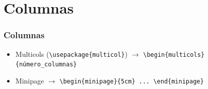 \section{Columnas}

\begin{frame}[fragile]
\frametitle{Columnas}
\begin{itemize}
    \item Multicols (\verb|\usepackage{multicol}|) $\rightarrow$ \verb|\begin{multicols}{número_columnas}| 
    \item Minipage  $\rightarrow$ \verb|\begin{minipage}{5cm} ... \end{minipage}| 
\end{itemize}



\end{frame}